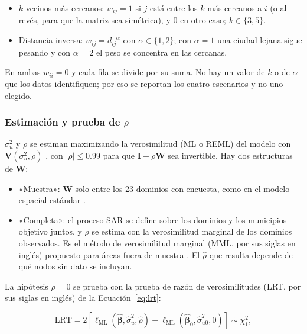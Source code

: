 \begin{itemize}
    \item $k$ vecinos más cercanos: $w_{ij} = 1$ si $j$ está entre los $k$ más cercanos a $i$ (o al revés, para que la matriz sea simétrica), y 0 en otro caso; $k \in \{3, 5\}$.
    \item Distancia inversa: $w_{ij} = d_{ij}^{-\alpha}$ con $\alpha \in \{1, 2\}$; con $\alpha = 1$ una ciudad lejana sigue pesando y con $\alpha = 2$ el peso se concentra en las cercanas.
\end{itemize}

En ambas $w_{ii} = 0$ y cada fila se divide por su suma. No hay un valor de $k$ o de $\alpha$ que los datos identifiquen; por eso se reportan los cuatro escenarios y no uno elegido.

\subsubsection{Estimación y prueba de \texorpdfstring{$\rho$}{rho}}

$\sigma_u^2$ y $\rho$ se estiman maximizando la verosimilitud (ML o REML) del modelo con $\mathbf{V}(\sigma_u^2, \rho)$ \cite[pp.~492--494]{morales2021smallarea}, con $|\rho| \leq 0.99$ para que $\mathbf{I} - \rho\mathbf{W}$ sea invertible. Hay dos estructuras de $\mathbf{W}$:

\begin{itemize}
    \item «Muestra»: $\mathbf{W}$ solo entre los 23 dominios con encuesta, como en el modelo espacial estándar \cite{PetrucciSalvati2006, PratesiSalvati2008}.
    \item «Completa»: el proceso SAR se define sobre los dominios y los municipios objetivo juntos, y $\rho$ se estima con la verosimilitud marginal de los dominios observados. Es el método de verosimilitud marginal (MML, por sus siglas en inglés) propuesto para áreas fuera de muestra \cite[pp.~142, 146--149]{Benedetti2024}. El $\hat{\rho}$ que resulta depende de qué nodos sin dato se incluyan.
\end{itemize}

La hipótesis $\rho = 0$ se prueba con la prueba de razón de verosimilitudes (LRT, por sus siglas en inglés) de la Ecuación~\ref{eq:lrt}:

\begin{equation}
    \text{LRT} = 2\left[\ell_{\text{ML}}(\hat{\boldsymbol{\beta}}, \hat{\sigma}_u^2, \hat{\rho}) - \ell_{\text{ML}}(\hat{\boldsymbol{\beta}}_0, \hat{\sigma}_{u0}^2, 0)\right] \;\overset{\cdot}{\sim}\; \chi^2_1 ,
    \label{eq:lrt}
\end{equation}

